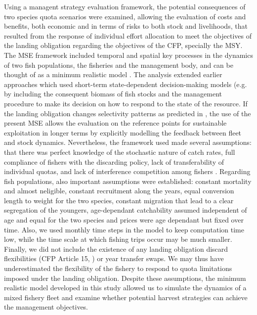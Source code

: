 \documentclass[12pt,oneline,a4paper,numbib]{ouparticle}
\numberwithin{equation}{subsection} %
\begin{document}
Using a managent strategy evaluation framework, the potential consequences of two species quota scenarios were examined, allowing the evaluation of costs and benefits, both economic and in terms of risks to both stock and livelihoods, that resulted from the response of individual effort allocation to meet the objectives of the landing obligation regarding the objectives of the CFP, specially the MSY. The MSE framework included temporal and spatial key processes in the dynamics of two fish populations, the fisheries and the management body, and can be thought of as a minimum realistic model \cite{Punt1995, Kell2007}. The analysis extended earlier approaches which used short-term state-dependent decision-making models (e.g. \cite{Alzorriz2018, Batsleer2016, Poos2010} by including the consequent biomass of fish stocks and the management procedure to make its decision on how to respond to the state of the resource. If the landing obligation changes selectivity patterns as predicted in \cite{Alzorriz2018, Batsleer2016}, the use of the present MSE allows the evaluation on the reference points for sustainable exploitation in longer terms by explicitly modelling the feedback between fleet and stock dynamics. Nevertheless, the framework used made several assumptions: that there was perfect knowledge of the stochastic nature of catch rates, full compliance of fishers with the discarding policy, lack of transferability of individual quotas, and lack of interference competition among fishers \cite{Alzorriz2018}. Regarding fish populations, also important assumptions were established: constant mortality and almost neligible, constant recruitment along the years, equal conversion length to weight for the two species, constant migration that lead to a clear segregation of the youngers, age-dependant catchability assumed independent of age and equal for the two species and prices were age dependant but fixed over time. Also, we used monthly time steps in the model to keep computation time low, while the time scale at which fishing trips occur may be much smaller. Finally, we did not include the existence of any landing obligation discard flexibilities (CFP Article 15, \cite{CFP2013}) or year transfer swaps. We may thus have underestimated the flexibility of the fishery to respond to quota limitations imposed under the landing obligation. Despite these assumptions, the minimum realistic model developed in this study allowed us to simulate the dynamics of a mixed fishery fleet and examine whether potential harvest strategies can achieve the management objectives.
\end{document}
